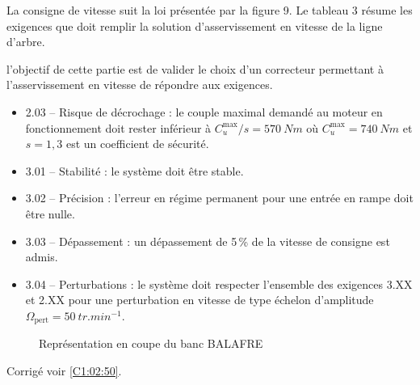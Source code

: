 \normalfalse \difficiletrue \tdifficilefalse
\correctionfalse



\setcounter{question}{0}
\ifcorrection
\else
{}
\fi

\ifprof
\else

La consigne de vitesse suit la loi présentée par la figure 9.
Le tableau 3 résume les exigences que doit remplir la solution d’asservissement en vitesse
de la ligne d’arbre.


\begin{obj}
l’objectif de cette partie est de valider le choix d’un correcteur permettant à
l’asservissement en vitesse de répondre aux exigences.
\end{obj}

\begin{itemize}
\item 2.03 -- Risque de décrochage : le couple maximal demandé au moteur en fonctionnement doit
rester inférieur à $C^{\text{max}}_u /s = \SI{570}{Nm}$ où $C^{\text{max}}_u = \SI{740}{Nm}$ et
$s = 1,3$ est un coefficient de sécurité.
\item 3.01 -- Stabilité : le système doit être stable.
\item 3.02 -- Précision : l’erreur en régime permanent pour une entrée en rampe doit
être nulle.
\item 3.03 -- Dépassement : un dépassement de 5\,\% de la vitesse de consigne est admis.
\item 3.04 -- Perturbations : le système doit respecter l’ensemble des exigences 3.XX et
2.XX pour une perturbation en vitesse de type échelon d’amplitude $\Omega_{\text{pert}} = \SI{50}{tr.min^{-1}}$.
\end{itemize}

 
\begin{figure}[H]
\centering
\caption{Représentation en coupe du banc BALAFRE \label{fig_50_01}}
\end{figure}
\fi








\ifprof
\else
\begin{flushright}
\footnotesize{Corrigé  voir \ref{C1:02:50}.}
\end{flushright}%
\fi